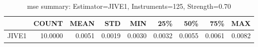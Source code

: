 \begin{table}[ht]
\centering
\caption{mse summary: Estimator=JIVE1, Instruments=125, Strength=0.70}
\begin{tabular}{lrrrrrrrr}
\toprule
 & COUNT & MEAN & STD & MIN & 25\% & 50\% & 75\% & MAX \\
\midrule
JIVE1 & 10.0000 & 0.0051 & 0.0019 & 0.0030 & 0.0032 & 0.0055 & 0.0061 & 0.0082 \\
\bottomrule
\end{tabular}
\end{table}
